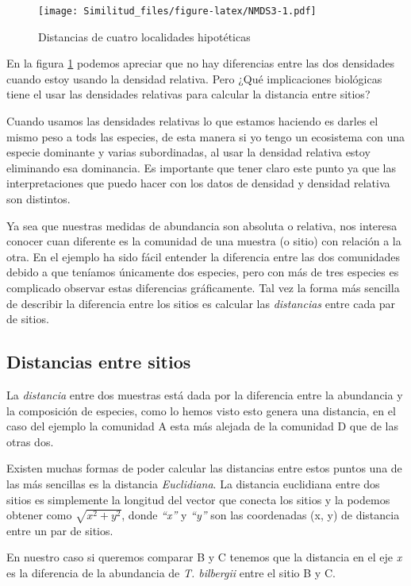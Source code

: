 \documentclass[]{book}
\begin{document}
\begin{figure}[htbp]
\centering
\texttt{[image: Similitud\_files/figure-latex/NMDS3-1.pdf]}
\caption{\label{fig:NMDS3}Distancias de cuatro localidades hipotéticas}
\end{figure}

En la figura \ref{fig:NMDS3} podemos apreciar que no hay diferencias
entre las dos densidades cuando estoy usando la densidad relativa. Pero
¿Qué implicaciones biológicas tiene el usar las densidades relativas
para calcular la distancia entre sitios?

Cuando usamos las densidades relativas lo que estamos haciendo es darles
el mismo peso a tods las especies, de esta manera si yo tengo un
ecosistema con una especie dominante y varias subordinadas, al usar la
densidad relativa estoy eliminando esa dominancia. Es importante que
tener claro este punto ya que las interpretaciones que puedo hacer con
los datos de densidad y densidad relativa son distintos.

Ya sea que nuestras medidas de abundancia son absoluta o relativa, nos
interesa conocer cuan diferente es la comunidad de una muestra (o sitio)
con relación a la otra. En el ejemplo ha sido fácil entender la
diferencia entre las dos comunidades debido a que teníamos únicamente
dos especies, pero con más de tres especies es complicado observar estas
diferencias gráficamente. Tal vez la forma más sencilla de describir la
diferencia entre los sitios es calcular las \emph{distancias} entre cada
par de sitios.

\subsection{Distancias entre sitios}\label{distancias-entre-sitios}

La \emph{distancia} entre dos muestras está dada por la diferencia entre
la abundancia y la composición de especies, como lo hemos visto esto
genera una distancia, en el caso del ejemplo la comunidad A esta más
alejada de la comunidad D que de las otras dos.

Existen muchas formas de poder calcular las distancias entre estos
puntos una de las más sencillas es la distancia \emph{Euclidiana}. La
distancia euclidiana entre dos sitios es simplemente la longitud del
vector que conecta los sitios y la podemos obtener como
\(\sqrt{x^2+y^2}\), donde \emph{``x''} y \emph{``y''} son las
coordenadas (x, y) de distancia entre un par de sitios.

En nuestro caso si queremos comparar B y C tenemos que la distancia en
el eje \emph{x} es la diferencia de la abundancia de \emph{T. bilbergii}
entre el sitio B y C.
\end{document}
